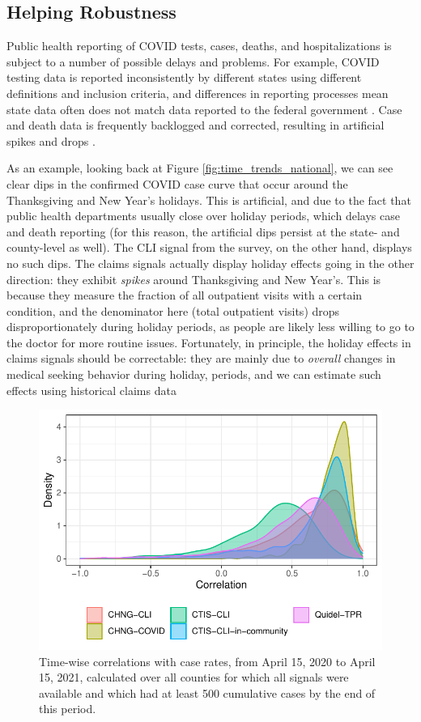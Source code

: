 \documentclass[9pt,twocolumn,twoside,lineno]{pnas-new}
\begin{document}
\subsection{Helping Robustness}

Public health reporting of COVID tests, cases, deaths, and hospitalizations is
subject to a number of possible delays and problems. For example, COVID testing
data is reported inconsistently by different states using different definitions
and inclusion criteria, and differences in reporting processes mean state data
often does not match data reported to the federal government
\cite{Schechtman:2021}. Case and death data is frequently backlogged and
corrected, resulting in artificial spikes and drops \cite{Simon:2021,
  ArvisaisAnhalt:2021}.

As an example, looking back at Figure \ref{fig:time_trends_national}, we can see
clear dips in the confirmed COVID case curve that occur around the Thanksgiving
and New Year's holidays. This is artificial, and due to the fact that public
health departments usually close over holiday periods, which delays case and
death reporting (for this reason, the artificial dips persist at the state- and
county-level as well). The CLI signal from the survey, on the other hand,
displays no such dips. The claims signals actually display holiday effects going
in the other direction: they exhibit \textit{spikes} around Thanksgiving and New
Year's. This is because they measure the fraction of all outpatient visits with
a certain condition, and the denominator here (total outpatient visits) drops
disproportionately during holiday periods, as people are likely less willing to
go to the doctor for more routine issues. Fortunately, in principle, the holiday
effects in claims signals should be correctable: they are mainly due to
\textit{overall} changes in medical seeking behavior during holiday, periods,
and we can estimate such effects using historical claims data

\begin{figure}[t]
  \includegraphics[width=\columnwidth]{fig/time_wise_correlation.pdf}
  \caption{Time-wise correlations with case rates, from April 15, 2020 to April
    15, 2021, calculated over all counties for which all signals were available
    and which had at least 500 cumulative cases by the end of this period.}
  \label{fig:time_wise_correlation}
\end{figure} 
\end{document}
